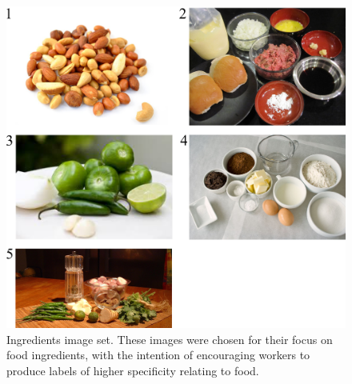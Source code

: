 \documentclass[letterpaper]{article}
\begin{document}
\begin{figure}
	\includegraphics[scale=1.00]{../figs/taskImages/ingredients.png}
	\caption{Ingredients image set.  These images were chosen for their focus on
	food ingredients, with the intention of encouraging workers to produce labels
	of higher specificity relating to food.}
	\label{fig:ingredients}
\end{figure}



\end{document}
